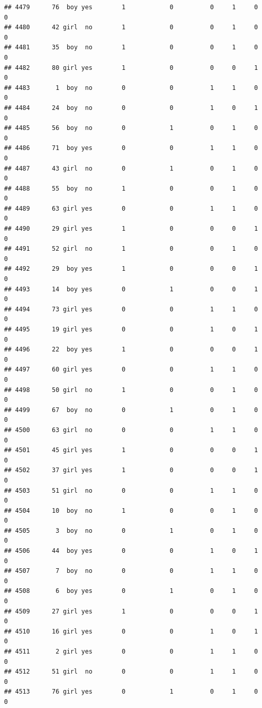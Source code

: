\documentclass[man]{apa6}
\begin{document}
\begin{verbatim}
## 4479      76  boy yes        1            0          0     1     0     0
## 4480      42 girl  no        1            0          0     1     0     0
## 4481      35  boy  no        1            0          0     1     0     0
## 4482      80 girl yes        1            0          0     0     1     0
## 4483       1  boy  no        0            0          1     1     0     0
## 4484      24  boy  no        0            0          1     0     1     0
## 4485      56  boy  no        0            1          0     1     0     0
## 4486      71  boy yes        0            0          1     1     0     0
## 4487      43 girl  no        0            1          0     1     0     0
## 4488      55  boy  no        1            0          0     1     0     0
## 4489      63 girl yes        0            0          1     1     0     0
## 4490      29 girl yes        1            0          0     0     1     0
## 4491      52 girl  no        1            0          0     1     0     0
## 4492      29  boy yes        1            0          0     0     1     0
## 4493      14  boy yes        0            1          0     0     1     0
## 4494      73 girl yes        0            0          1     1     0     0
## 4495      19 girl yes        0            0          1     0     1     0
## 4496      22  boy yes        1            0          0     0     1     0
## 4497      60 girl yes        0            0          1     1     0     0
## 4498      50 girl  no        1            0          0     1     0     0
## 4499      67  boy  no        0            1          0     1     0     0
## 4500      63 girl  no        0            0          1     1     0     0
## 4501      45 girl yes        1            0          0     0     1     0
## 4502      37 girl yes        1            0          0     0     1     0
## 4503      51 girl  no        0            0          1     1     0     0
## 4504      10  boy  no        1            0          0     1     0     0
## 4505       3  boy  no        0            1          0     1     0     0
## 4506      44  boy yes        0            0          1     0     1     0
## 4507       7  boy  no        0            0          1     1     0     0
## 4508       6  boy yes        0            1          0     1     0     0
## 4509      27 girl yes        1            0          0     0     1     0
## 4510      16 girl yes        0            0          1     0     1     0
## 4511       2 girl yes        0            0          1     1     0     0
## 4512      51 girl  no        0            0          1     1     0     0
## 4513      76 girl yes        0            1          0     1     0     0

\end{verbatim}
\end{document}
